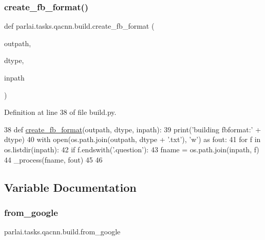 \subsubsection{\texorpdfstring{create\+\_\+fb\+\_\+format()}{create\_fb\_format()}}
{\footnotesize\ttfamily def parlai.\+tasks.\+qacnn.\+build.\+create\+\_\+fb\+\_\+format (\begin{DoxyParamCaption}\item[{}]{outpath,  }\item[{}]{dtype,  }\item[{}]{inpath }\end{DoxyParamCaption})}



Definition at line 38 of file build.\+py.


\begin{DoxyCode}
38 \textcolor{keyword}{def }\hyperlink{namespaceparlai_1_1tasks_1_1wikiqa_1_1build_a554828702769592403db58c955d1dfe3}{create\_fb\_format}(outpath, dtype, inpath):
39     print(\textcolor{stringliteral}{'building fbformat:'} + dtype)
40     with open(os.path.join(outpath, dtype + \textcolor{stringliteral}{'.txt'}), \textcolor{stringliteral}{'w'}) \textcolor{keyword}{as} fout:
41         \textcolor{keywordflow}{for} f \textcolor{keywordflow}{in} os.listdir(inpath):
42             \textcolor{keywordflow}{if} f.endswith(\textcolor{stringliteral}{'.question'}):
43                 fname = os.path.join(inpath, f)
44                 \_process(fname, fout)
45 
46 
\end{DoxyCode}


\subsection{Variable Documentation}
\mbox{\label{namespaceparlai_1_1tasks_1_1qacnn_1_1build_a802bd82198e0cfcccf501ee4ea910636}} 
\subsubsection{\texorpdfstring{from\+\_\+google}{from\_google}}
{\footnotesize\ttfamily parlai.\+tasks.\+qacnn.\+build.\+from\+\_\+google}



